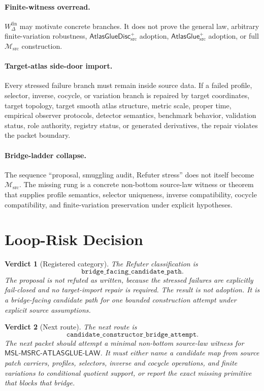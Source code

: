 \documentclass[11pt]{article}
\newcommand{\Msrc}{\mathcal{M}_{\mathrm{src}}}
\newcommand{\AtlasGlue}{\mathsf{AtlasGlue}_{\mathrm{src}}^{+}}
\newcommand{\AtlasGlueDisc}{\mathsf{AtlasGlueDisc}_{\mathrm{src}}^{+}}
\newcommand{\MSL}{\mathsf{MSL}\mbox{-}\mathsf{MSRC}\mbox{-}\mathsf{ATLASGLUE}\mbox{-}\mathsf{LAW}}
\newcommand{\Wfin}{W_{\Delta}^{\mathrm{fin}}}
\newtheorem{verdict}{Verdict}
\begin{document}
\paragraph{Finite-witness overread.}
\(\Wfin\) may motivate concrete branches. It does not prove the general law,
arbitrary finite-variation robustness, \(\AtlasGlueDisc\) adoption,
\(\AtlasGlue\) adoption, or full \(\Msrc\) construction.

\paragraph{Target-atlas side-door import.}
Every stressed failure branch must remain inside source data. If a failed
profile, selector, inverse, cocycle, or variation branch is repaired by target
coordinates, target topology, target smooth atlas structure, metric scale,
proper time, empirical observer protocols, detector semantics, benchmark
behavior, validation status, role authority, registry status, or generated
derivatives, the repair violates the packet boundary.

\paragraph{Bridge-ladder collapse.}
The sequence ``proposal, smuggling audit, Refuter stress'' does not itself
become \(\Msrc\). The missing rung is a concrete non-bottom source-law witness
or theorem that supplies profile semantics, selector uniqueness, inverse
compatibility, cocycle compatibility, and finite-variation preservation under
explicit hypotheses.

\section{Loop-Risk Decision}

\begin{verdict}[Registered category]
The Refuter classification is
\[
  \texttt{bridge\_facing\_candidate\_path}.
\]
The proposal is not refuted as written, because the stressed failures are
explicitly fail-closed and no target-import repair is required. The result is
not adoption. It is a bridge-facing candidate path for one bounded
construction attempt under explicit source assumptions.
\end{verdict}

\begin{verdict}[Next route]
The next route is
\[
  \texttt{candidate\_constructor\_bridge\_attempt}.
\]
The next packet should attempt a minimal non-bottom source-law witness for
\(\MSL\). It must either name a candidate map from source patch carriers,
profiles, selectors, inverse and cocycle operations, and finite variations to
conditional quotient support, or report the exact missing primitive that
blocks that bridge.
\end{verdict}
\end{document}
